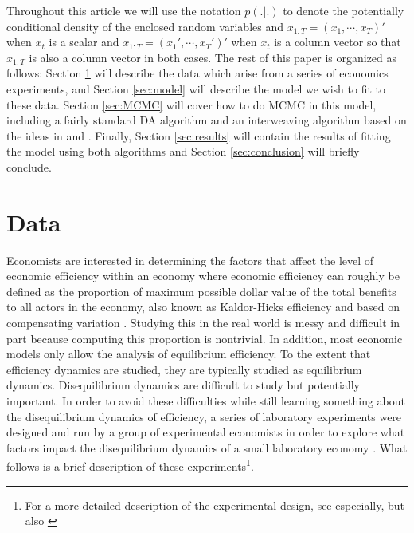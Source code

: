 \documentclass[graybox]{svmult}
\begin{document}
Throughout this article we will use the notation $p(.|.)$ to denote the potentially conditional density of the enclosed random variables and $x_{1:T}=(x_1,\cdots,x_T)'$ when $x_t$ is a scalar and $x_{1:T}=(x_1',\cdots,x_T')'$ when $x_t$ is a column vector so that $x_{1:T}$ is also a column vector in both cases. The rest of this paper is organized as follows: Section \ref{sec:data} will describe the data which arise from a series of economics experiments, and Section \ref{sec:model} will describe the model we wish to fit to these data. Section \ref{sec:MCMC} will cover how to do MCMC in this model, including a fairly standard DA algorithm and an interweaving algorithm based on the ideas in \citet{simpson2014interweaving} and \citet{yu2011center}. Finally, Section \ref{sec:results} will contain the results of fitting the model using both algorithms and Section \ref{sec:conclusion} will briefly conclude.

\section{Data}\label{sec:data}
Economists are interested in determining the factors that affect the level of economic efficiency within an economy where economic efficiency can roughly be defined as the proportion of maximum possible dollar value of the total benefits to all actors in the economy, also known as Kaldor-Hicks efficiency and based on compensating variation \citep{kaldor1939welfare,mas1995microeconomic}. Studying this in the real world is messy and difficult in part because computing this proportion is nontrivial. In addition, most economic models only allow the analysis of equilibrium efficiency. To the extent that efficiency dynamics are studied, they are typically studied as equilibrium dynamics. Disequilibrium dynamics are difficult to study but potentially important. In order to avoid these difficulties while still learning something about the disequilibrium dynamics of efficiency, a series of laboratory experiments were designed and run by a group of experimental economists in order to explore what factors impact the disequilibrium dynamics of a small laboratory economy \citep{crockett2009exchange,kimbrough2010exchange}. What follows is a brief description of these experiments\footnote{For a more detailed description of the experimental design, see \citet{crockett2009exchange} especially, but also \citet{kimbrough2010exchange}}.
\end{document}
